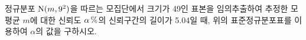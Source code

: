 \noindent\begin{minipage}[t]{0.58\linewidth}\vspace{0pt}\raggedright 정규분포 $\mathrm{N}(m{,}\mkern3mu\mathopen{}9^2)$을 따르는 모집단에서 크기가 49인 표본을 임의추출하여 추정한 모평균 $m$에 대한 신뢰도 $\alpha\mkern3mu \%$의 신뢰구간의 길이가 5.04일 때, 위의 표준정규분포표를 이용하여 $\alpha$의 값을 구하시오.\end{minipage}\hfill\begin{minipage}[t]{0.4\linewidth}\vspace{0pt}\centering \resizebox{\ifdim\width>\linewidth\linewidth\else\width\fi}{!}{}\end{minipage}\par
